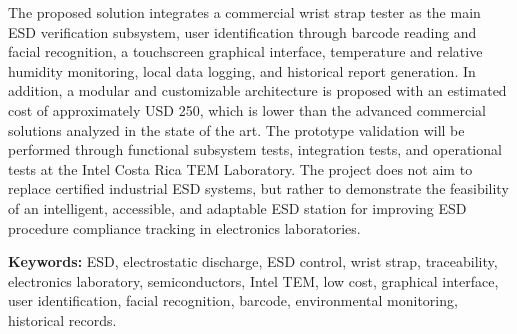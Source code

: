 The proposed solution integrates a commercial wrist strap tester as the main ESD verification 
subsystem, user identification through barcode reading and facial recognition, a touchscreen 
graphical interface, temperature and relative humidity monitoring, local data logging, and 
historical report generation. In addition, a modular and customizable architecture is proposed 
with an estimated cost of approximately USD 250, which is lower than the advanced commercial 
solutions analyzed in the state of the art. The prototype validation will be performed through 
functional subsystem tests, integration tests, and operational tests at the Intel Costa Rica 
TEM Laboratory. The project does not aim to replace certified industrial ESD systems, but 
rather to demonstrate the feasibility of an intelligent, accessible, and adaptable ESD station 
for improving ESD procedure compliance tracking in electronics laboratories.

\textbf{Keywords:} ESD, electrostatic discharge, ESD control, wrist strap, traceability, 
electronics laboratory, semiconductors, Intel TEM, low cost, graphical interface, 
user identification, facial recognition, barcode, environmental monitoring, historical records.
